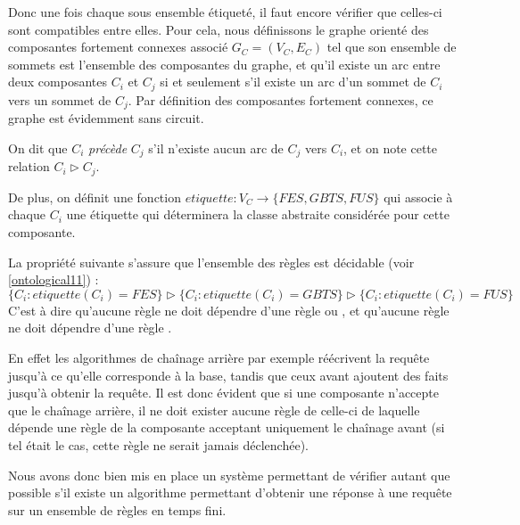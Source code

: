 Donc une fois chaque sous ensemble étiqueté, il faut encore vérifier que celles-ci
sont compatibles entre elles.
Pour cela, nous définissons le graphe orienté des composantes fortement connexes associé
$G_{C} = (V_C,E_C)$
tel que son ensemble de sommets est l'ensemble des composantes du graphe, et
qu'il existe un arc entre deux composantes $C_i$ et $C_j$ si et seulement s'il existe un
arc d'un sommet de $C_i$ vers un sommet de $C_j$.
Par définition des composantes fortement connexes, ce graphe est évidemment sans
circuit.

On dit que $C_i$ {\em précède} $C_j$ s'il n'existe aucun arc de $C_j$ vers $C_i$, et on
note cette relation $C_i \triangleright C_j$.

De plus, on définit une fonction $etiquette : V_C \rightarrow \{FES,GBTS,FUS\}$ qui
associe à chaque $C_i$ une étiquette qui déterminera la classe abstraite considérée pour
cette composante.

La propriété suivante s'assure que l'ensemble des règles est décidable (voir
\ref{ontological11}) :
$\{C_i : etiquette(C_i) = FES\} \triangleright \{C_i : etiquette(C_i) = GBTS\} \triangleright
\{C_i : etiquette(C_i) = FUS\}$
C'est à dire qu'aucune règle \fes ne doit dépendre d'une règle \fus ou \gbts, et
qu'aucune règle \gbts ne doit dépendre d'une règle \fus.

En effet les algorithmes de chaînage arrière par exemple réécrivent la requête jusqu'à ce
qu'elle corresponde à la base, tandis que ceux avant ajoutent des faits jusqu'à obtenir
la requête. Il est donc évident que si une composante n'accepte que le chaînage arrière,
il ne doit exister aucune règle de celle-ci de laquelle dépende une règle de la
composante acceptant uniquement le chaînage avant (si tel était le cas, cette règle ne
serait jamais déclenchée).

Nous avons donc bien mis en place un système permettant de vérifier autant que possible
s'il existe un algorithme permettant d'obtenir une réponse à une requête sur un ensemble de 
règles en temps fini.

